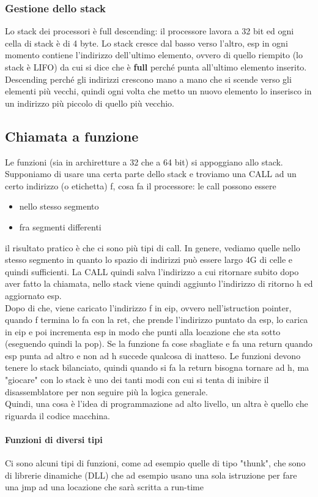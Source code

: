 \documentclass[12pt, oneside]{extbook}
\begin{document}
\subsubsection{Gestione dello stack}
Lo stack dei processori è full descending: il processore lavora a 32 bit ed ogni cella di stack è di 4 byte. Lo stack cresce dal basso verso l'altro, esp in ogni momento contiene l'indirizzo dell'ultimo elemento, ovvero di quello riempito (lo stack è LIFO) da cui si dice che è \textbf{full} perché punta all'ultimo elemento inserito. Descending perché gli indirizzi crescono mano a mano che si scende verso gli elementi più vecchi, quindi ogni volta che metto un nuovo elemento lo inserisco in un indirizzo più piccolo di quello più vecchio.
\subsection{Chiamata a funzione}
Le funzioni (sia in archiretture a 32 che a 64 bit) si appoggiano allo stack. Supponiamo di usare una certa parte dello stack e troviamo una CALL ad un certo indirizzo (o etichetta) f, cosa fa il processore: le call possono essere
\begin{itemize}
\item nello stesso segmento
\item fra segmenti differenti
\end{itemize}
il risultato pratico è che ci sono più tipi di call. In genere, vediamo quelle nello stesso segmento in quanto lo spazio di indirizzi può essere largo 4G di celle e quindi sufficienti. La CALL quindi salva l'indirizzo a cui ritornare subito dopo aver fatto la chiamata, nello stack viene quindi aggiunto l'indirizzo di ritorno h ed aggiornato esp.\\ Dopo di che, viene caricato l'indirizzo f in eip, ovvero nell'istruction pointer, quando f termina lo fa con la \textsf{ret}, che prende l'indirizzo puntato da esp, lo carica in eip e poi incrementa esp in modo che punti alla locazione che sta sotto (eseguendo quindi la pop). Se la funzione fa cose sbagliate e fa una return quando esp punta ad altro e non ad h succede qualcosa di inatteso. Le funzioni devono tenere lo stack bilanciato, quindi quando si fa la return bisogna tornare ad h, ma "giocare" con lo stack è uno dei tanti modi con cui si tenta di inibire il disassemblatore per non seguire più la logica generale.\\ Quindi, una cosa è l'idea di programmazione ad alto livello, un altra è quello che riguarda il codice macchina.
\paragraph{Funzioni di diversi tipi}
Ci sono alcuni tipi di funzioni, come ad esempio quelle di tipo "thunk", che sono di librerie dinamiche (DLL) che ad esempio usano una sola istruzione per fare una jmp ad una locazione che sarà scritta a run-time
\end{document}
